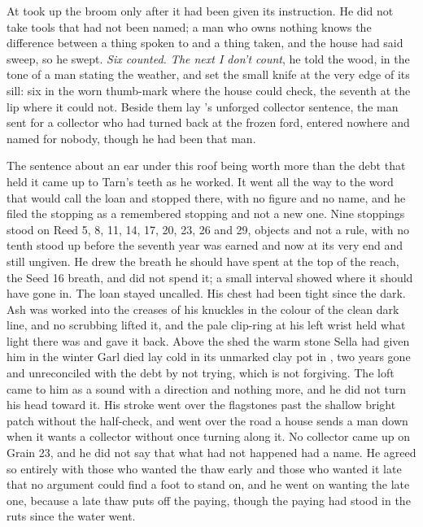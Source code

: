 \scenebreak

At   took up the broom only after it had been given its instruction. He did not take tools that had not been named; a man who owns nothing knows the difference between a thing spoken to and a thing taken, and the house had said sweep, so he swept. \emph{Six counted. The next I don't count}, he told the wood, in the tone of a man stating the weather, and set the small knife at the very edge of its sill: six in the worn thumb-mark where the house could check, the seventh at the lip where it could not. Beside them lay 's unforged collector sentence, the man sent for a collector who had turned back at the frozen ford, entered nowhere and named for nobody, though he had been that man.

The sentence about an ear under this roof being worth more than the debt that held it came up to Tarn's teeth as he worked. It went all the way to the word that would call the loan and stopped there, with no figure and no name, and he filed the stopping as a remembered stopping and not a new one. Nine stoppings stood on Reed 5, 8, 11, 14, 17, 20, 23, 26 and 29, objects and not a rule, with no tenth stood up before the seventh year was earned and now at its very end and still ungiven. He drew the breath he should have spent at the top of the reach, the Seed 16 breath, and did not spend it; a small interval showed where it should have gone in. The loan stayed uncalled. His chest had been tight since the dark. Ash was worked into the creases of his knuckles in the colour of the clean dark line, and no scrubbing lifted it, and the pale clip-ring at his left wrist held what light there was and gave it back. Above the shed the warm stone Sella had given him in the winter Garl died lay cold in its unmarked clay pot in , two years gone and unreconciled with the debt by not trying, which is not forgiving. The loft came to him as a sound with a direction and nothing more, and he did not turn his head toward it. His stroke went over the flagstones past the shallow bright patch without the half-check, and went over the road a house sends a man down when it wants a collector without once turning along it. No collector came up  on Grain 23, and he did not say that what had not happened had a name. He agreed so entirely with those who wanted the thaw early and those who wanted it late that no argument could find a foot to stand on, and he went on wanting the late one, because a late thaw puts off the paying, though the paying had stood in the ruts since the water went.


